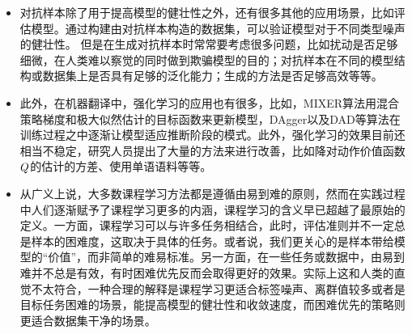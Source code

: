 \begin{itemize}
\vspace{0.5em}
\item 对抗样本除了用于提高模型的健壮性之外，还有很多其他的应用场景，比如评估模型。通过构建由对抗样本构造的数据集，可以验证模型对于不同类型噪声的健壮性。 但是在生成对抗样本时常常要考虑很多问题，比如扰动是否足够细微，在人类难以察觉的同时做到欺骗模型的目的；对抗样本在不同的模型结构或数据集上是否具有足够的泛化能力；生成的方法是否足够高效等等。

\vspace{0.5em}
\item 此外，在机器翻译中，强化学习的应用也有很多，比如，MIXER算法用混合策略梯度和极大似然估计的目标函数来更新模型，DAgger以及DAD等算法在训练过程之中逐渐让模型适应推断阶段的模式。此外，强化学习的效果目前还相当不稳定，研究人员提出了大量的方法来进行改善，比如降对动作价值函数${Q}$的估计的方差、使用单语语料等等。

\vspace{0.5em}
\item 从广义上说，大多数课程学习方法都是遵循由易到难的原则，然而在实践过程中人们逐渐赋予了课程学习更多的内涵，课程学习的含义早已超越了最原始的定义。一方面，课程学习可以与许多任务相结合，此时，评估准则并不一定总是样本的困难度，这取决于具体的任务。或者说，我们更关心的是样本带给模型的“价值”，而非简单的难易标准。另一方面，在一些任务或数据中，由易到难并不总是有效，有时困难优先反而会取得更好的效果。实际上这和人类的直觉不太符合，一种合理的解释是课程学习更适合标签噪声、离群值较多或者是目标任务困难的场景，能提高模型的健壮性和收敛速度，而困难优先的策略则更适合数据集干净的场景。

\vspace{0.5em}
\end{itemize}
